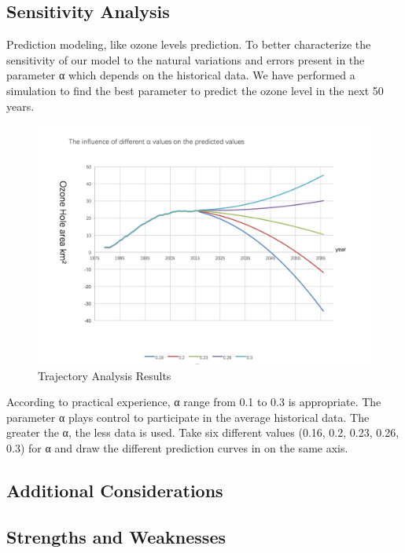 \documentclass[12pt]{article}
\begin{document}
\subsection{Sensitivity Analysis}
Prediction modeling, like ozone levels prediction. To better characterize the sensitivity of our model to the natural variations and errors present in the parameter α which depends on the historical data. We have performed a simulation to find the best parameter to predict the ozone level in the next 50 years.
\begin{center}
\begin{figure}[htpb]
\centering
\includegraphics[scale=0.6]{ts}
\caption{Trajectory Analysis Results}\label{fig:xgxfx}
\end{figure}
\end{center}
According to practical experience, α range from 0.1 to 0.3 is appropriate. The parameter α plays control to participate in the average historical data. The greater the α, the less data is used. Take six different values (0.16, 0.2, 0.23, 0.26, 0.3) for α and draw the different prediction curves in on the same axis.
\subsection{Additional Considerations}
\subsection{Strengths and Weaknesses}
\end{document}
